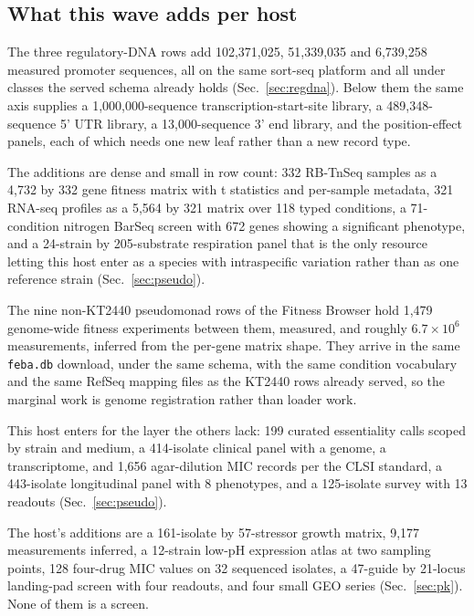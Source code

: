 \subsection{What this wave adds per host}\label{sec:state-rows}

 The three regulatory-DNA rows add
102,371,025, 51,339,035 and 6,739,258 measured promoter sequences, all on the same sort-seq
platform and all under classes the served schema already holds (Sec.~\ref{sec:regdna}). Below
them the same axis supplies a 1,000,000-sequence transcription-start-site library, a
489,348-sequence 5' UTR library, a 13,000-sequence 3' end library, and the position-effect
panels, each of which needs one new leaf rather than a new record type.

 The additions are dense and small in row
count: 332 RB-TnSeq samples as a 4,732 by 332 gene fitness matrix with t statistics and
per-sample metadata, 321 RNA-seq profiles as a 5,564 by 321 matrix over 118 typed conditions,
a 71-condition nitrogen BarSeq screen with 672 genes showing a significant phenotype, and a
24-strain by 205-substrate respiration panel that is the only resource letting this host enter
as a species with intraspecific variation rather than as one reference strain
(Sec.~\ref{sec:pseudo}).

 The nine non-KT2440 pseudomonad rows
of the Fitness Browser hold 1,479 genome-wide fitness experiments between them, measured, and
roughly $6.7\times10^{6}$ measurements, inferred from the per-gene matrix shape. They arrive
in the same \texttt{feba.db} download, under the same schema, with the same condition
vocabulary and the same RefSeq mapping files as the KT2440 rows already served, so the
marginal work is genome registration rather than loader work.

 This host enters for the
layer the others lack: 199 curated essentiality calls scoped by strain and medium, a
414-isolate clinical panel with a genome, a transcriptome, and 1,656 agar-dilution MIC records
per the CLSI standard, a 443-isolate longitudinal panel with 8 phenotypes, and a
125-isolate survey with 13 readouts (Sec.~\ref{sec:pseudo}).

 The host's additions are a 161-isolate by
57-stressor growth matrix, 9,177 measurements inferred, a 12-strain low-pH expression atlas at
two sampling points, 128 four-drug MIC values on 32 sequenced isolates, a 47-guide by
21-locus landing-pad screen with four readouts, and four small GEO series
(Sec.~\ref{sec:pk}). None of them is a screen.

